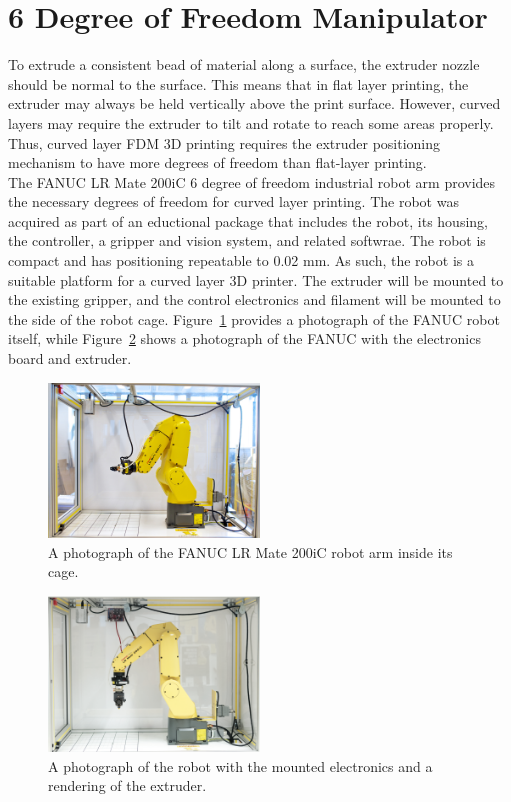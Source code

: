 \section{6 Degree of Freedom Manipulator}

\indent

To extrude a consistent bead of material along a surface, the extruder nozzle should be normal to the surface. This means that in flat layer printing, the extruder may always be held vertically above the print surface. However, curved layers may require the extruder to tilt and rotate to reach some areas properly. Thus, curved layer FDM 3D printing requires the extruder positioning mechanism to have more degrees of freedom than flat-layer printing. \\

The FANUC LR Mate 200iC 6 degree of freedom industrial robot arm provides the necessary degrees of freedom for curved layer printing. The robot was acquired as part of an eductional package that includes the robot, its housing, the controller, a gripper and vision system, and related softwrae. The robot is compact and has positioning repeatable to 0.02 mm. As such, the robot is a suitable platform for a curved layer 3D printer. The extruder will be mounted to the existing gripper, and the control electronics and filament will be mounted to the side of the robot cage. Figure~\ref{fig:robot} provides a photograph of the FANUC robot itself, while Figure~\ref{fig:robot with things} shows a photograph of the FANUC with the electronics board and extruder.\\


\begin{figure}[htp]
\centering
\includegraphics[width=0.5\textwidth]{./figures/robot}
\caption{A photograph of the FANUC LR Mate 200iC robot arm inside its cage.}
\label{fig:robot}
\end{figure}

\begin{figure}[htp]
\centering
\includegraphics[width=0.5\textwidth]{./figures/robot-extruder-electronics}
\caption{A photograph of the robot with the mounted electronics and a rendering of the extruder.}
\label{fig:robot with things}
\end{figure}